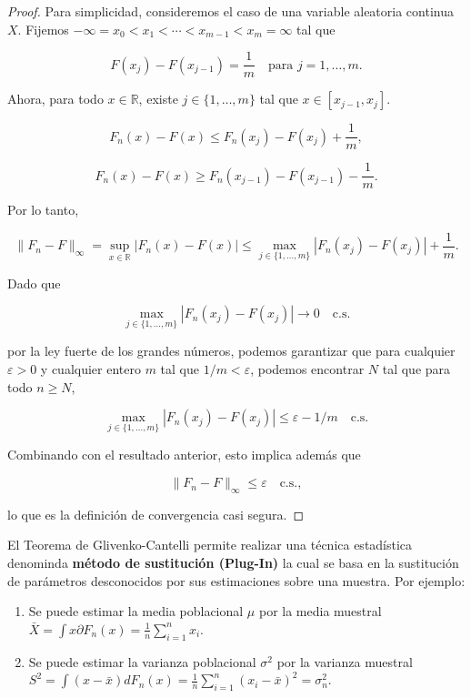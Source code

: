 \begin{proof}
	Para simplicidad, consideremos el caso de una variable aleatoria continua \( X \). Fijemos \( -\infty = x_0 < x_1 < \cdots < x_{m-1} < x_m = \infty \) tal que

	\[
		F(x_j) - F(x_{j-1}) = \frac{1}{m} \quad \text{para } j = 1, \dots, m.
	\]

	Ahora, para todo \( x \in \mathbb{R} \), existe \( j \in \{1, \dots, m\} \) tal
	que \( x \in [x_{j-1}, x_j] \).

	\[
		F_n(x) - F(x) \leq F_n(x_j) - F(x_j) + \frac{1}{m},
	\]

	\[
		F_n(x) - F(x) \geq F_n(x_{j-1}) - F(x_{j-1}) - \frac{1}{m}.
	\]

	Por lo tanto,

	\[
		\|F_n - F\|_{\infty} = \sup_{x \in \mathbb{R}} |F_n(x) - F(x)| \leq \max_{j \in \{1, \dots, m\}} |F_n(x_j) - F(x_j)| + \frac{1}{m}.
	\]

	Dado que

	\[
		\max_{j \in \{1, \dots, m\}} |F_n(x_j) - F(x_j)| \to 0 \quad \text{c.s.}
	\]

	por la ley fuerte de los grandes números, podemos garantizar que para cualquier
	\( \varepsilon > 0 \) y cualquier entero \( m \) tal que \( 1/m < \varepsilon
	\), podemos encontrar \( N \) tal que para todo \( n \geq N \),

	\[
		\max_{j \in \{1, \dots, m\}} |F_n(x_j) - F(x_j)| \leq \varepsilon - 1/m \quad \text{c.s.}
	\]

	Combinando con el resultado anterior, esto implica además que

	\[
		\|F_n - F\|_{\infty} \leq \varepsilon \quad \text{c.s.},
	\]

	lo que es la definición de convergencia casi segura.
\end{proof}

\begin{corolario}
	El Teorema de Glivenko-Cantelli permite realizar una técnica estadística denominda \textbf{método de sustitución (Plug-In)} la cual se basa en la sustitución de parámetros desconocidos por sus estimaciones sobre una muestra. Por ejemplo:
	\begin{enumerate}
		\item Se puede estimar la media poblacional $\mu$ por la media muestral $\bar{X} =
			      \int x\partial{F_n(x)} = \frac{1}{n}\sum_{i = 1}^{n}x_i $.
		\item Se puede estimar la varianza poblacional $\sigma^2$ por la varianza muestral
		      $S^2 = \int (x - \bar{x})dF_n(x) = \frac{1}{n}\sum_{i = 1}^{n}(x_i - \bar{x})^2
			      = \sigma_n^2$.
	\end{enumerate}
\end{corolario}

